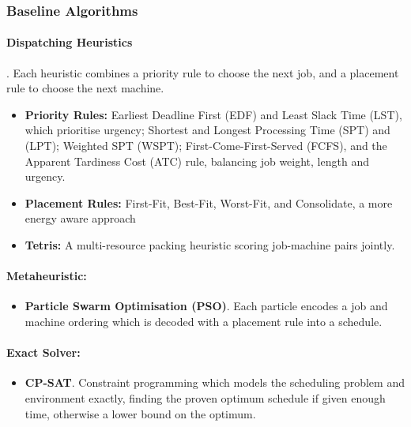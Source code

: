 \documentclass[12pt]{article}
\begin{document}
\subsubsection{Baseline Algorithms}
\paragraph{Dispatching Heuristics}. Each heuristic combines a priority rule to choose the next job, and a placement rule to choose the next machine.
\begin{itemize}
    \item \textbf{Priority Rules:} Earliest Deadline First (EDF) and Least Slack Time (LST), which prioritise urgency; Shortest and Longest Processing Time (SPT) and (LPT); Weighted SPT (WSPT); First-Come-First-Served (FCFS), and the Apparent Tardiness Cost (ATC) rule, balancing job weight, length and urgency.
    \item \textbf{Placement Rules:} First-Fit, Best-Fit, Worst-Fit, and Consolidate, a more energy aware approach \cite{energyaware2012}
    \item \textbf{Tetris:} A multi-resource packing heuristic scoring job-machine pairs jointly.
\end{itemize}

\paragraph{Metaheuristic:}
\begin{itemize}
    \item \textbf{Particle Swarm Optimisation (PSO)}. Each particle encodes a job and machine ordering which is decoded with a placement rule into a schedule. 
\end{itemize}

\paragraph{Exact Solver:}
\begin{itemize}
    \item \textbf{CP-SAT}. Constraint programming which models the scheduling problem and environment exactly, finding the proven optimum schedule if given enough time, otherwise a lower bound on the optimum.
\end{itemize}
\end{document}
